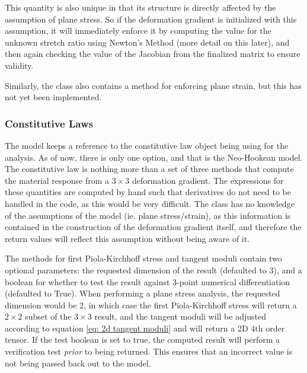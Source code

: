 \documentclass[]{spie}  %
\begin{document}
This quantity is also unique in that its structure is directly affected by the assumption of plane stress. So if the deformation gradient is initialized with this assumption, it will immediately enforce it by computing the value for the unknown stretch ratio using Newton's Method (more detail on this later), and then again checking the value of the Jacobian from the finalized matrix to ensure validity.

Similarly, the class also contains a method for enforcing plane strain, but this has not yet been implemented. 

\subsubsection{Constitutive Laws}
The model keeps a reference to the constitutive law object being using for the analysis. As of now, there is only one option, and that is the Neo-Hookean model. The constitutive law is nothing more than a set of three methods that compute the material response from a $3 \times 3$ deformation gradient. The expressions for these quantities are computed by hand such that derivatives do not need to be handled in the code, as this would be very difficult. The class has no knowledge of the assumptions of the model (ie. plane stress/strain), as this information is contained in the construction of the deformation gradient itself, and therefore the return values will reflect this assumption without being aware of it. 

The methods for first Piola-Kirchhoff stress and tangent moduli contain two optional parameters: the requested dimension of the result (defaulted to 3), and a boolean for whether to test the result against 3-point numerical differentiation (defaulted to True). When performing a plane stress analysis, the requested dimension would be 2, in which case the first Piola-Kirchhoff stress will return a $2 \times 2$ subset of the $3 \times 3$ result, and the tangent moduli will be adjusted according to equation \ref{eq: 2d tangent moduli} and will return a 2D 4th order tensor. If the test boolean is set to true, the computed result will perform a verification test \textit{prior} to being returned. This ensures that an incorrect value is not being passed back out to the model. 
\end{document}
